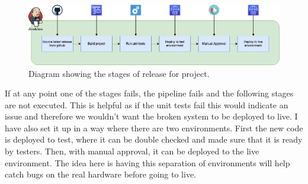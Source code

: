   \begin{figure}[H]
    \centering
    \includegraphics[width=12cm]{assets/relasePipeline.drawio.png}
    \caption{Diagram showing the stages of release for project.}
    \label{fig:releasePipeline}
  \end{figure}

  If at any point one of the stages fails, the pipeline fails and the following stages are not executed. This is helpful as if the unit tests fail this would
  indicate an issue and therefore we wouldn't want the broken system to be deployed to live. I have also set it up in a way where there are two environments.
  First the new code is deployed to test, where it can be double checked and made sure that it is ready by testers. Then, with manual approval, it can be 
  deployed to the live environment. The idea here is having this separation of environments will help catch bugs on the real hardware before going to live.

\newpage